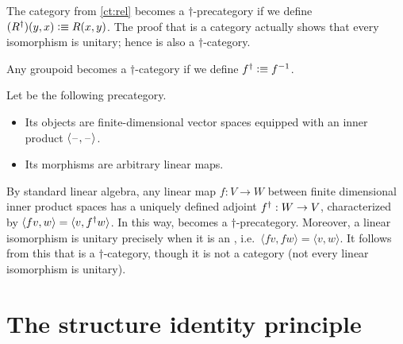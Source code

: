 \documentclass[hott-all.tex]{subfiles}
\begin{document}
\begin{eg}
  The category \urel from \cref{ct:rel} becomes a $\dagger$-pre\-cat\-e\-go\-ry if we define $({R}^{\dagger})(y,x) \vcentcolon\equiv R(x,y)$.
  The proof that \urel is a category actually shows that every isomorphism is unitary; hence \urel is also a $\dagger$-category.
\end{eg}

\begin{eg}
  Any groupoid becomes a $\dagger$-category if we define ${f}^{\dagger} \vcentcolon\equiv {f}^{-1}$.
\end{eg}

\begin{eg}
  Let \uhilb be the following precategory.
  \begin{itemize}
  \item Its objects are finite-dimensional  vector spaces equipped with an inner product $\langle \mathord{\hspace{1pt}\text{--}\hspace{1pt}},\mathord{\hspace{1pt}\text{--}\hspace{1pt}}\rangle$.
  \item Its morphisms are arbitrary linear maps.
  \end{itemize}
  By standard linear algebra, any linear map $f:V\to W$ between finite
  dimensional inner product spaces has a uniquely defined adjoint ${f}^{\dagger}:W\to V$, characterized by $\langle f v,w\rangle = \langle v,{f}^{\dagger} w\rangle$.
  In this way, \uhilb becomes a $\dagger$-precategory.
  Moreover, a linear isomorphism is unitary precisely when it is an ,
  i.e.\ $\langle fv,fw\rangle = \langle v,w\rangle$.
  It follows from this that \uhilb is a $\dagger$-category, though it is not a category (not every linear isomorphism is unitary).
\end{eg}



\section{The structure identity principle}
\end{document}
